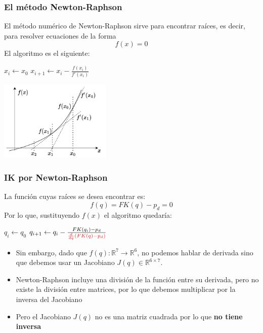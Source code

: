 \begin{frame}\frametitle{El método Newton-Raphson}
  El método numérico de Newton-Raphson sirve para encontrar raíces, es decir, para resolver ecuaciones de la forma
  \[f(x) = 0\]
  El algoritmo es el siguiente:
  \[\]
  \begin{multicols}{2}
  \begin{algorithm}[H]
    \DontPrintSemicolon
    $x_i \leftarrow x_0$\;
    {
       $x_{i+1} \leftarrow x_i - \frac{f(x_i)}{f'(x_i)}$
    }
  \end{algorithm}
  \includegraphics[width=0.4\textwidth]{Figures/NewtonRaphson.pdf}
  \end{multicols}
\end{frame}

\begin{frame}\frametitle{IK por Newton-Raphson}
  La función cuyas raíces se desea encontrar es:
  \[f(q) = FK(q) - p_d = 0\]
  Por lo que, sustituyendo $f(x)$ el algoritmo quedaría:
  \begin{algorithm}[H]
    \DontPrintSemicolon
    $q_i \leftarrow q_0$\;
    {
       $q_{i+1} \leftarrow q_i - \frac{FK(q_i) - p_d}{\textcolor{red}{\frac{d}{dq}\left(FK(q) - p_d\right)}}$
    }
  \end{algorithm}
  \begin{itemize}
  \item Sin embargo, dado que $f(q): \mathbb{R}^7\rightarrow \mathbb{R}^6$, no podemos hablar de derivada sino que debemos usar un Jacobiano $J(q)\in\mathbb{R}^{6\times 7}$.
  \item Newton-Raphson incluye una división de la función entre su derivada, pero no existe la división entre matrices, por lo que debemos multiplicar por la inversa del Jacobiano
  \item Pero el Jacobiano $J(q)$ no es una matriz cuadrada por lo que \textbf{no tiene inversa}
  \end{itemize}
\end{frame}

